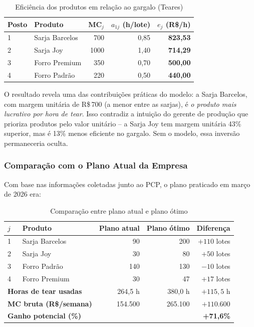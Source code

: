 \begin{table}[H]
\centering
\caption{Eficiência dos produtos em relação ao gargalo (Teares)}
\label{tab:efic}
\begin{tabular}{llrrr}
\toprule
\textbf{Posto} & \textbf{Produto} & \textbf{MC$_j$} & \textbf{$a_{1j}$ (h/lote)} & \textbf{$e_j$ (R\$/h)} \\
\midrule
1 & Sarja Barcelos  &  700 & 0,85 & \textbf{823,53} \\
2 & Sarja Joy       & 1000 & 1,40 & \textbf{714,29} \\
3 & Forro Premium   &  350 & 0,70 & \textbf{500,00} \\
4 & Forro Padrão    &  220 & 0,50 & \textbf{440,00} \\
\bottomrule
\end{tabular}
\end{table}

O resultado revela uma das contribuições práticas do modelo: a Sarja Barcelos,
com margem unitária de R\$\,700 (a menor entre as sarjas), é \textit{o produto
mais lucrativo por hora de tear}. Isso contradiz a intuição do gerente de produção
que prioriza produtos pelo valor unitário -- a Sarja Joy tem margem unitária 43\%
superior, mas é 13\% menos eficiente no gargalo. Sem o modelo, essa inversão
permaneceria oculta.

\subsubsection{Comparação com o Plano Atual da Empresa}

Com base nas informações coletadas junto ao PCP, o plano praticado em março de
2026 era:

\begin{table}[H]
\centering
\caption{Comparação entre plano atual e plano ótimo}
\label{tab:comp_planos}
\begin{tabular}{llrrr}
\toprule
\textbf{$j$} & \textbf{Produto} & \textbf{Plano atual} & \textbf{Plano ótimo} & \textbf{Diferença} \\
\midrule
1 & Sarja Barcelos  &  90 & 200 & $+110$ lotes \\
2 & Sarja Joy       &  30 &  80 &  $+50$ lotes \\
3 & Forro Padrão    & 140 & 130 &  $-10$ lotes \\
4 & Forro Premium   &  30 &  47 &  $+17$ lotes \\
\midrule
\multicolumn{2}{l}{\textbf{Horas de tear usadas}}       & 264,5 h & 380,0 h & $+115,5$ h \\
\multicolumn{2}{l}{\textbf{MC bruta (R\$/semana)}}      & 154.500 & 265.100 & $+110.600$ \\
\multicolumn{2}{l}{\textbf{Ganho potencial (\%)}}       &         &         & \textbf{+71,6\%} \\
\bottomrule
\end{tabular}
\end{table}

